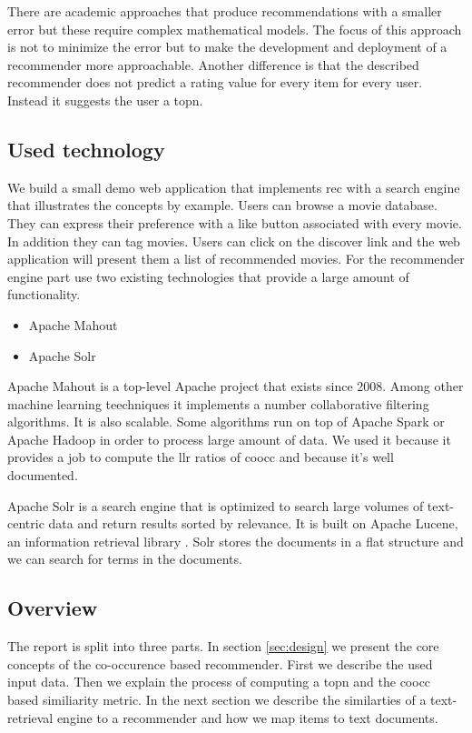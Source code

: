 There are academic approaches that produce recommendations with a smaller error but these require complex mathematical models. The focus of this approach is not to minimize the error but to make the development and deployment of a recommender more approachable. Another difference is that the described recommender does not predict a rating value for every item for every user. Instead it suggests the user a \gls{topn}.


\subsection{Used technology}
\label{sec:tech}

We build a small demo web application that implements \gls{rec} with a search engine that illustrates the concepts by example. Users can browse a movie database. They can express their preference with a like button associated with every movie. In addition they can tag movies. Users can click on the discover link and the web application will present them a list of recommended movies. For the recommender engine part use two existing technologies that provide a large amount of functionality.

\begin{itemize}
\item Apache Mahout
\item Apache Solr
\end{itemize}

Apache Mahout is a top-level Apache project that exists since 2008. Among other machine learning teechniques it implements a number collaborative filtering algorithms. It is also \gls{scalable}. Some algorithms run on top of Apache Spark or Apache Hadoop in order to process large amount of data\cite{Owen}. We used it because it provides a job to compute the \gls{llr} ratios of \gls{coocc} and because it's well documented.

Apache Solr is a search engine that is optimized to search large volumes of text-centric data and return results sorted by relevance. It is built on Apache Lucene, an information retrieval library \cite{grainger}. Solr stores the documents in a flat structure and we can search for terms in the documents.

\subsection{Overview}
The report is split into three parts.
In section \ref{sec:design} we present the core concepts of the co-occurence based recommender. First we describe the used input data. Then we explain the process of computing a \gls{topn} and the \gls{coocc} based similiarity metric. In the next section we describe the similarties of a text-retrieval engine to a recommender and how we map items to text documents.

